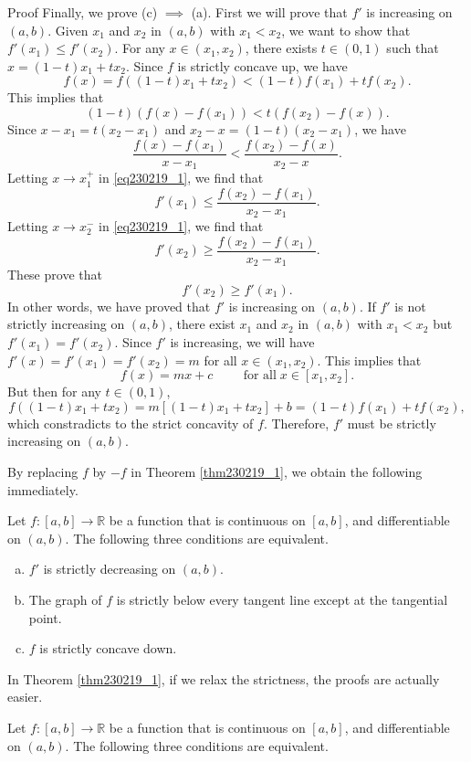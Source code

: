 \begin{example}{}
\begin{myproof}{Proof}
Finally, we prove (c) $\implies $ (a). First we will prove that $f'$ is increasing on $(a, b)$. Given $x_1$ and $x_2$ in $(a, b)$ with $x_1<x_2$, we want to show that  $f'(x_1)\leq f'(x_2)$. For any $x\in (x_1, x_2)$, there exists $t\in (0,1)$ such that $x=(1-t)x_1+tx_2$. Since $f$ is strictly concave up, we have
\[f(x)=f((1-t)x_1+tx_2)<(1-t)f(x_1)+tf(x_2).\]
This implies that
\[(1-t)(f(x)-f(x_1))<t(f(x_2)-f(x)).\]
Since $x-x_1=t(x_2-x_1)$ and $x_2-x=(1-t)(x_2-x_1)$, we have
\begin{equation}\label{eq230219_1}\frac{f(x)-f(x_1)}{x-x_1}<\frac{f(x_2)-f(x)}{x_2-x}.\end{equation} Letting $x\to x_1^+$ in \eqref{eq230219_1}, we find that
\[f'(x_1)\leq \frac{f(x_2)-f(x_1)}{x_2-x_1}.\]\bp
Letting $x\to x_2^-$ in \eqref{eq230219_1}, we find that
\[f'(x_2)\geq \frac{f(x_2)-f(x_1)}{x_2-x_1}.\]These prove that
\[f'(x_2)\geq f'(x_1).\]
In other words, we have proved that $f'$ is increasing on $(a,b)$. If $f'$ is not strictly increasing on $(a, b)$, there exist $x_1$ and $x_2$ in $(a, b)$ with $x_1<x_2$ but $f'(x_1)=f'(x_2)$. Since $f'$ is increasing, we will have $f'(x)=f'(x_1)=f'(x_2)=m$ for all $x\in (x_1, x_2)$. This implies that 
\[f(x)=mx+c \hspace{1cm}\text{for all}\; x\in [x_1, x_2].\]
But then for any $t\in (0,1)$,
\[f((1-t)x_1+tx_2)=m\left[(1-t)x_1+tx_2\right]+b=(1-t)f(x_1)+tf(x_2),\]
which constradicts to the strict concavity of $f$. Therefore, $f'$ must be strictly increasing on $(a,b)$.
\end{myproof}

By replacing $f$ by $-f$ in Theorem \ref{thm230219_1}, we obtain the following immediately.
\begin{theorem}[label=thm230219_2]{}
 Let  $f:[a, b]\rightarrow\mathbb{R}$  be a   function that is continuous on $[a,b]$, and   differentiable on $(a, b)$. The following three conditions are equivalent.
\begin{enumerate}[(a)]

\item $f'$ is strictly decreasing on $(a, b)$.
\item The graph of $f$ is strictly below every tangent line except at the tangential point.
\item $f$ is strictly concave down.
\end{enumerate}
 
\end{theorem}

In Theorem \ref{thm230219_1}, if we relax the strictness, the proofs are actually easier.  
\begin{theorem}[label=thm230219_3]{}
 Let  $f:[a, b]\rightarrow\mathbb{R}$  be a   function that is continuous on $[a,b]$, and   differentiable on $(a, b)$. The following three conditions are equivalent.
\begin{enumerate}[(a)]


\end{enumerate}
\end{theorem}
\end{example}
